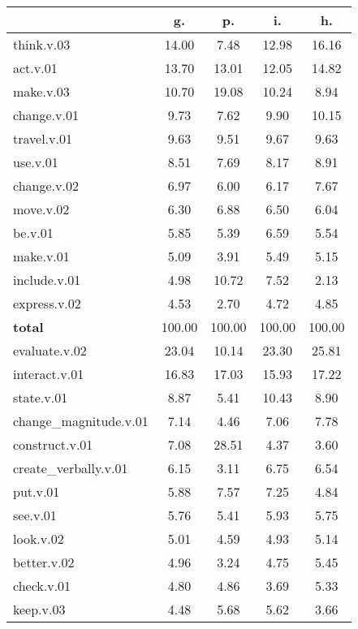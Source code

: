 \begin{table}[h!]
\begin{center}
\begin{tabular}{| l || c | c | c | c |}\hline
 & {\bf g.} & {\bf p.} & {\bf i.} & {\bf h.} \\\hline\hline
think.v.03 & 14.00  & 7.48  & 12.98  & 16.16 \\\hline
act.v.01 & 13.70  & 13.01  & 12.05  & 14.82 \\\hline
make.v.03 & 10.70  & 19.08  & 10.24  & 8.94 \\\hline
change.v.01 & 9.73  & 7.62  & 9.90  & 10.15 \\\hline
travel.v.01 & 9.63  & 9.51  & 9.67  & 9.63 \\\hline
use.v.01 & 8.51  & 7.69  & 8.17  & 8.91 \\\hline
change.v.02 & 6.97  & 6.00  & 6.17  & 7.67 \\\hline
move.v.02 & 6.30  & 6.88  & 6.50  & 6.04 \\\hline
be.v.01 & 5.85  & 5.39  & 6.59  & 5.54 \\\hline
make.v.01 & 5.09  & 3.91  & 5.49  & 5.15 \\\hline
include.v.01 & 4.98  & 10.72  & 7.52  & 2.13 \\\hline
express.v.02 & 4.53  & 2.70  & 4.72  & 4.85 \\\hline\hline
{{\bf total}} & 100.00  & 100.00  & 100.00  & 100.00 \\\hline\hline\hline
evaluate.v.02 & 23.04  & 10.14  & 23.30  & 25.81 \\\hline
interact.v.01 & 16.83  & 17.03  & 15.93  & 17.22 \\\hline
state.v.01 & 8.87  & 5.41  & 10.43  & 8.90 \\\hline
change\_magnitude.v.01 & 7.14  & 4.46  & 7.06  & 7.78 \\\hline
construct.v.01 & 7.08  & 28.51  & 4.37  & 3.60 \\\hline
create\_verbally.v.01 & 6.15  & 3.11  & 6.75  & 6.54 \\\hline
put.v.01 & 5.88  & 7.57  & 7.25  & 4.84 \\\hline
see.v.01 & 5.76  & 5.41  & 5.93  & 5.75 \\\hline
look.v.02 & 5.01  & 4.59  & 4.93  & 5.14 \\\hline
better.v.02 & 4.96  & 3.24  & 4.75  & 5.45 \\\hline
check.v.01 & 4.80  & 4.86  & 3.69  & 5.33 \\\hline
keep.v.03 & 4.48  & 5.68  & 5.62  & 3.66 \\\hline\hline

\end{tabular}
\end{center}
\end{table}
